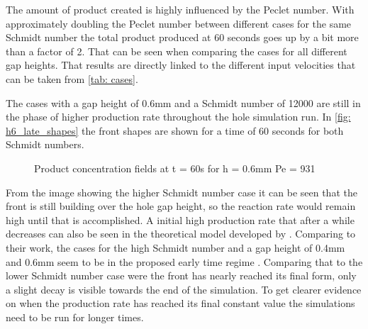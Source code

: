 \documentclass[../thesis.tex]{subfiles}
\begin{document}
The amount of product created is highly influenced by the Peclet number. With approximately doubling the Peclet number between different cases for the same Schmidt number the total product produced at 60 seconds goes up by a bit more than a factor of 2. That can be seen when comparing the cases for all different gap heights. That results are directly linked to the different input velocities that can be taken from \autoref{tab: cases}.

The cases with a gap height of 0.6mm and a Schmidt number of 12000 are still in the phase of higher production rate throughout the hole simulation run. In \autoref{fig: h6_late_shapes} the front shapes are shown for a time of 60 seconds for both Schmidt numbers.
\begin{figure}[htb]
	\centering
	\qquad
	\caption{Product concentration fields at t = 60s for  h = 0.6mm  Pe = 931}%
	\label{fig: h6_late_shapes}%
\end{figure}
From the image showing the higher Schmidt number case it can be seen that the front is still building over the hole gap height, so the reaction rate would remain high until that is accomplished. A initial high production rate that after a while decreases can also be seen in the theoretical model developed by \cite{comolli2021dynamics}. Comparing to their work, the cases for the high Schmidt number and a gap height of 0.4mm and 0.6mm seem to be in the proposed early time regime \cite{comolli2021dynamics}.
Comparing that to the lower Schmidt number case were the front has nearly reached its final form, only a slight decay is visible towards the end of the simulation. To get clearer evidence on when the production rate has reached its final constant value the simulations need to be run for longer times.
\end{document}
